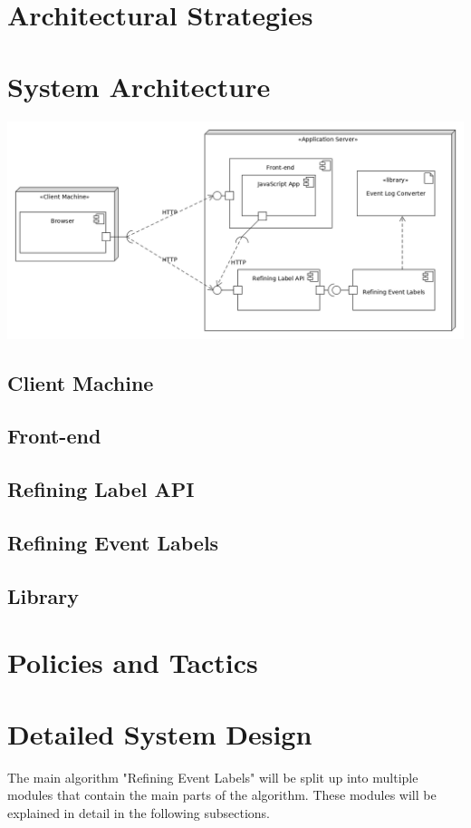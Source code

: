 \documentclass[notitlepage]{article}
\begin{document}
\begin{flushleft}
\section{Architectural Strategies}

\section{System Architecture}
\includegraphics[scale=0.4]{UML_Architecture/Architecture_Overview.png}

\subsection{Client Machine}
\subsection{Front-end}
\subsection{Refining Label API}
\subsection{Refining Event Labels}
\subsection{Library}

\section{Policies and Tactics}

\section{Detailed System Design}
The main algorithm "Refining Event Labels" will be split up into multiple modules that contain the main parts of the algorithm. These modules will be explained in detail in the following subsections.

\end{flushleft}
\end{document}
